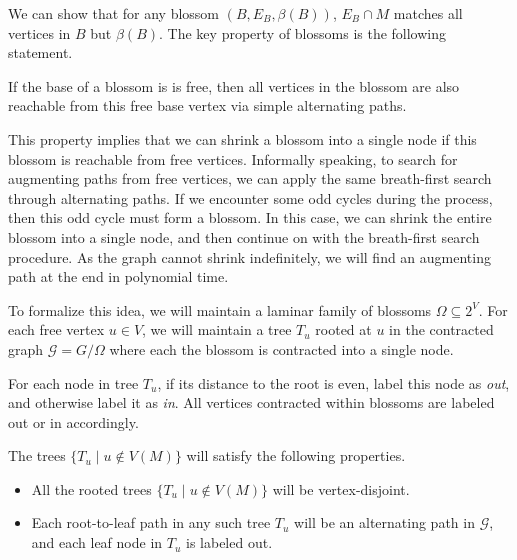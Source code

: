 We can show that for any blossom $(B, E_B, \beta(B))$, $E_B\cap M$ matches all vertices in $B$ but $\beta(B)$. The key property of blossoms is the following statement.
\begin{observation}
	If the base of a blossom is is free, then all vertices in the blossom are also reachable from this free base vertex via simple alternating paths.
\end{observation}
This property implies that we can shrink a blossom into a single node if this blossom is reachable from free vertices. Informally speaking, to search for augmenting paths from free vertices, we can apply the same breath-first search through alternating paths. If we encounter some odd cycles during the process, then this odd cycle must form a blossom. In this case, we can shrink the entire blossom into a single node, and then continue on with the breath-first search procedure. As the graph cannot shrink indefinitely, we will find an augmenting path at the end in polynomial time.

To formalize this idea, we will maintain a laminar family of blossoms $\Omega\subseteq 2^V$. For each free vertex $u\in V$, we will maintain a tree $T_u$ rooted at $u$ in the contracted graph $\mathcal{G} = G / \Omega$ where each the blossom is contracted into a single node.

\begin{definition}
	For each node in tree $T_u$, if its distance to the root is even, label this node as \emph{out}, and otherwise label it as \emph{in}. All vertices contracted within blossoms are labeled out or in accordingly.
\end{definition}

The trees $\{T_u\mid u\notin V(M)\}$ will satisfy the following properties.
\begin{itemize}
	\item All the rooted trees $\{T_u\mid u\notin V(M)\}$ will be vertex-disjoint.
	\item Each root-to-leaf path in any such tree $T_u$ will be an alternating path in $\mathcal{G}$, and each leaf node in $T_u$ is labeled out.
\end{itemize}


